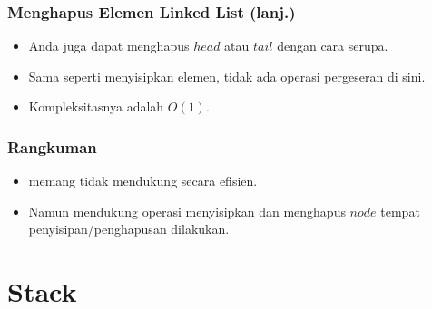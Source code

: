 \begin{frame}
\frametitle{Menghapus Elemen Linked List (lanj.)}
\begin{itemize}
  \item Anda juga dapat menghapus $head$ atau $tail$ dengan cara serupa.
  \item Sama seperti menyisipkan elemen, tidak ada operasi pergeseran di sini.
  \item Kompleksitasnya adalah $O(1)$.
\end{itemize}
\end{frame}

\begin{frame}
\frametitle{Rangkuman}
\begin{itemize}
  \item {} memang tidak mendukung  secara efisien.
  \item Namun  mendukung operasi menyisipkan dan menghapus  $node$ tempat penyisipan/penghapusan dilakukan.
\end{itemize}
\end{frame}

\section{Stack}
\frame{\sectionpage}

%

